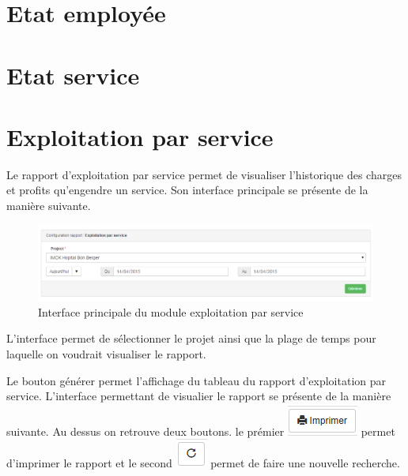 \documentclass[12pt,a4paper]{report}
\begin{document}
\newpage
\section{Etat employée}

\newpage
\section{Etat service}



\newpage
\section{Exploitation par service}
Le rapport d'exploitation par service permet de visualiser l'historique des charges et profits qu'engendre un service. Son interface principale se présente de la manière suivante. 

\begin{figure}[h]
\begin{center}
\includegraphics[width=14cm]{pic/ExploService.png}
\end{center}
\caption{Interface principale du module exploitation par service}
\label{Interface principale du module exploitation par service}
\end{figure}

L'interface permet de sélectionner le projet ainsi que la plage de temps pour laquelle on voudrait visualiser le rapport. 

Le bouton générer permet l'affichage du tableau du rapport d'exploitation par service.
L'interface permettant de visualier le rapport se présente de la manière suivante. Au dessus on retrouve deux boutons. le prémier 
\includegraphics[scale=0.7]{pic/Print.png} permet d'imprimer le rapport et le second \includegraphics[scale=0.7]{pic/refresh.png} permet de faire une nouvelle recherche.
\end{document}
